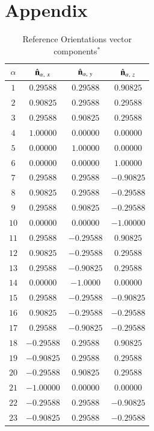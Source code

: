\documentclass[final,  3p]{elsarticle}
\begin{document}
\section*{Appendix}
\setcounter{table}{0}
\renewcommand{\thetable}{A\arabic{table}}
\begin{table}[h]
\begin{center}
\caption{\label{tab:A1}
%
Reference Orientations vector components$^*$}
\begin{tabular}{|c|c|c|c|}
\hline\hline
$\alpha$ & $\hat{\bf n}_{\alpha,\ x}$ &  $\hat{\bf n}_{\alpha,\ y}$ &  $\hat{\bf n}_{\alpha,\ z}$ \\
\hline
$1$  & $ 0.29588$ &  $ 0.29588$ & $ 0.90825$ \\
$2$  & $ 0.90825$ &  $ 0.29588$ & $ 0.29588$ \\
$3$  & $ 0.29588$ &  $ 0.90825$ & $ 0.29588$ \\
$4$  & $ 1.00000$ &  $ 0.00000$ & $ 0.00000$ \\
$5$  & $ 0.00000$ &  $ 1.00000$ & $ 0.00000$ \\
$6$  & $ 0.00000$ &  $ 0.00000$ & $ 1.00000$ \\
$7$  & $ 0.29588$ &  $ 0.29588$ & $-0.90825$ \\
$8$  & $ 0.90825$ &  $ 0.29588$ & $-0.29588$ \\
$9$  & $ 0.29588$ &  $ 0.90825$ & $-0.29588$ \\
$10$ & $ 0.00000$ &  $ 0.00000$ & $-1.00000$ \\
$11$ & $ 0.29588$ &  $-0.29588$ & $ 0.90825$ \\
$12$ & $ 0.90825$ &  $-0.29588$ & $ 0.29588$ \\
$13$ & $ 0.29588$ &  $-0.90825$ & $ 0.29588$ \\
$14$ & $ 0.00000$ &  $ -1.0000$ & $ 0.00000$ \\
$15$ & $ 0.29588$ &  $-0.29588$ & $-0.90825$ \\
$16$ & $ 0.90825$ &  $-0.29588$ & $-0.29588$ \\
$17$ & $ 0.29588$ &  $-0.90825$ & $-0.29588$ \\
$18$ & $-0.29588$ &  $ 0.29588$ & $ 0.90825$ \\
$19$ & $-0.90825$ &  $ 0.29588$ & $ 0.29588$ \\
$20$ & $-0.29588$ &  $ 0.90825$ & $ 0.29588$ \\
$21$ & $-1.00000$ &  $ 0.00000$ & $ 0.00000$ \\
$22$ & $-0.29588$ &  $ 0.29588$ & $-0.90825$ \\
$23$ & $-0.90825$ &  $ 0.29588$ & $-0.29588$ \\

\end{tabular}
\end{center}
\end{table}
\end{document}

